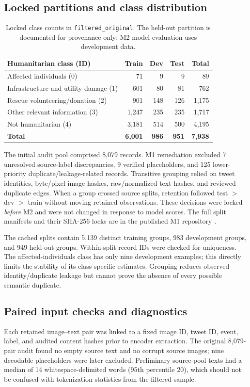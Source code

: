 \documentclass[11pt,a4paper]{article}
\newcommand{\primary}{\texttt{filtered\_original}}
\begin{document}
\subsection{Locked partitions and class distribution}
\begin{table}[htbp]
\centering\small
\caption{Locked class counts in \primary. The held-out partition is documented for provenance only; M2 model evaluation uses development data.}
\label{tab:classcounts}
\begin{tabularx}{\linewidth}{@{}>{\raggedright\arraybackslash}Xrrrr@{}}
\toprule
Humanitarian class (ID) & Train & Dev & Test & Total \\
\midrule
Affected individuals (0) & 71 & 9 & 9 & 89 \\
Infrastructure and utility damage (1) & 601 & 80 & 81 & 762 \\
Rescue volunteering/donation (2) & 901 & 148 & 126 & 1,175 \\
Other relevant information (3) & 1,247 & 235 & 235 & 1,717 \\
Not humanitarian (4) & 3,181 & 514 & 500 & 4,195 \\
\midrule
\textbf{Total} & \textbf{6,001} & \textbf{986} & \textbf{951} & \textbf{7,938} \\
\bottomrule
\end{tabularx}
\end{table}
The initial audit pool comprised 8,079 records. M1 remediation excluded 7 unresolved source-label discrepancies, 9 verified placeholders, and 125 lower-priority duplicate/leakage-related records. Transitive grouping relied on tweet identities, byte/pixel image hashes, raw/normalized text hashes, and reviewed duplicate edges. When a group crossed source splits, retention followed test $>$ dev $>$ train without moving retained observations. These decisions were locked \emph{before} M2 and were not changed in response to model scores. The full split manifests and their SHA-256 locks are in the published M1 repository \cite{handbook2026}.

The cached splits contain 5,139 distinct training groups, 983 development groups, and 949 held-out groups. Within-split record IDs were checked for uniqueness. The affected-individuals class has only nine development examples; this directly limits the stability of its class-specific estimates. Grouping reduces observed identity/duplicate leakage but cannot prove the absence of every possible semantic duplicate.

\subsection{Paired input checks and diagnostics}
Each retained image--text pair was linked to a fixed image ID, tweet ID, event, label, and audited content hashes prior to encoder extraction. The original 8,079-pair audit found no empty source text and no corrupt source images; nine decodable placeholders were later excluded. Preliminary source-pool texts had a median of 14 whitespace-delimited words (95th percentile 20), which should not be confused with tokenization statistics from the filtered sample.
\end{document}
